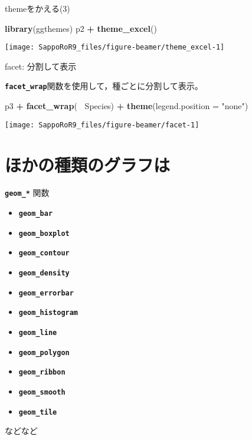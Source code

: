 \documentclass[ignorenonframetext,]{beamer}
\newenvironment{Shaded}{\begin{snugshade}}{\end{snugshade}}
\newcommand{\KeywordTok}[1]{\textcolor[rgb]{0.13,0.29,0.53}{\textbf{#1}}}
\newcommand{\DataTypeTok}[1]{\textcolor[rgb]{0.13,0.29,0.53}{#1}}
\newcommand{\StringTok}[1]{\textcolor[rgb]{0.31,0.60,0.02}{#1}}
\newcommand{\OperatorTok}[1]{\textcolor[rgb]{0.81,0.36,0.00}{\textbf{#1}}}
\newcommand{\NormalTok}[1]{#1}
\providecommand{\tightlist}{%
  \setlength{\itemsep}{0pt}\setlength{\parskip}{0pt}}
\let\oldShaded\Shaded
\let\endoldShaded\endShaded
\renewenvironment{Shaded}{\footnotesize\oldShaded}{\endoldShaded}
\begin{document}
\begin{frame}[fragile]{themeをかえる(3)}

\begin{Shaded}
\begin{Highlighting}[]
\KeywordTok{library}\NormalTok{(ggthemes)}
\NormalTok{p2 }\OperatorTok{+}\StringTok{ }\KeywordTok{theme_excel}\NormalTok{()}
\end{Highlighting}
\end{Shaded}

\texttt{[image: SappoRoR9\_files/figure-beamer/theme\_excel-1]}

\end{frame}

\begin{frame}[fragile]{facet: 分割して表示}

\textbf{\texttt{facet\_wrap}}関数を使用して，種ごとに分割して表示。

\begin{Shaded}
\begin{Highlighting}[]
\NormalTok{p3 }\OperatorTok{+}\StringTok{ }\KeywordTok{facet_wrap}\NormalTok{(}\OperatorTok{~}\StringTok{ }\NormalTok{Species) }\OperatorTok{+}\StringTok{ }\KeywordTok{theme}\NormalTok{(}\DataTypeTok{legend.position =} \StringTok{"none"}\NormalTok{)}
\end{Highlighting}
\end{Shaded}

\texttt{[image: SappoRoR9\_files/figure-beamer/facet-1]}

\end{frame}

\section{ほかの種類のグラフは}

\begin{frame}[fragile]{\textbf{\texttt{geom\_*}} 関数}

\begin{itemize}
\tightlist
\item
  \textbf{\texttt{geom\_bar}}
\item
  \textbf{\texttt{geom\_boxplot}}
\item
  \textbf{\texttt{geom\_contour}}
\item
  \textbf{\texttt{geom\_density}}
\item
  \textbf{\texttt{geom\_errorbar}}
\item
  \textbf{\texttt{geom\_histogram}}
\item
  \textbf{\texttt{geom\_line}}
\item
  \textbf{\texttt{geom\_polygon}}
\item
  \textbf{\texttt{geom\_ribbon}}
\item
  \textbf{\texttt{geom\_smooth}}
\item
  \textbf{\texttt{geom\_tile}}
\end{itemize}

などなど

\end{frame}
\end{document}
